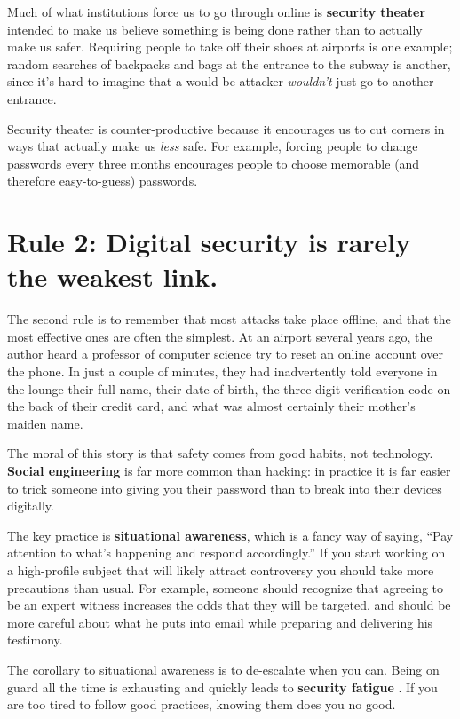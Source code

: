 \documentclass[10pt,letterpaper]{article}
\begin{document}
Much of what institutions force us to go through online is \textbf{security
theater} intended to make us believe something is being done rather than to
actually make us safer. Requiring people to take off their shoes at airports is
one example; random searches of backpacks and bags at the entrance to the subway
is another, since it's hard to imagine that a would-be attacker \emph{wouldn't}
just go to another entrance.

Security theater is counter-productive because it encourages us to cut corners
in ways that actually make us \emph{less} safe. For example, forcing people to
change passwords every three months encourages people to choose memorable (and
therefore easy-to-guess) passwords.

\section*{Rule 2: Digital security is rarely the weakest link.}

The second rule is to remember that most attacks take place offline, and that
the most effective ones are often the simplest. At an airport several years ago,
the author heard a professor of computer science try to reset an online account
over the phone. In just a couple of minutes, they had inadvertently told
everyone in the lounge their full name, their date of birth, the three-digit
verification code on the back of their credit card, and what was almost
certainly their mother's maiden name.

The moral of this story is that safety comes from good habits, not
technology. \textbf{Social engineering} is far more common than hacking: in
practice it is far easier to trick someone into giving you their password than
to break into their devices digitally.

The key practice is \textbf{situational awareness}, which is a fancy way of
saying, ``Pay attention to what's happening and respond accordingly.'' If you
start working on a high-profile subject that will likely attract controversy you
should take more precautions than usual. For example, someone should recognize
that agreeing to be an expert witness increases the odds that they will be
targeted, and should be more careful about what he puts into email while
preparing and delivering his testimony.

The corollary to situational awareness is to de-escalate when you can.  Being on
guard all the time is exhausting and quickly leads to \textbf{security fatigue}
\cite{Stan2016}. If you are too tired to follow good practices, knowing them does
you no good.
\end{document}
